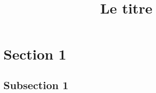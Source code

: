 \documentclass[a4paper]{article}
\title{Le titre}
\begin{document}
\maketitle
\section{Section 1}
\subsection{Subsection 1}
\end{document}
